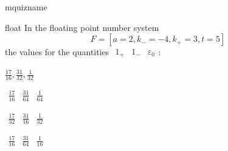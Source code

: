 \documentclass[12pt]{article}
\begin{document}
\begin{quiz}{mquizname}


\begin{multi}{float}
In the floating point number system $$  F=\left[ a=2, k_{-}=-4, k_{+}=3, t=5 \right]  $$ the values for the quantities 
$ {\begin{array}{ccc}1_{+}& 1_{-}& \varepsilon_{0}\end{array}} $:
\item* $ \frac{17}{16}, \frac{31}{32}, \frac{1}{32} $
\item  $ {\begin{array}{ccc}\frac{17}{16}& \frac{31}{64}& \frac{1}{64}\end{array}} $
\item  $ {\begin{array}{ccc}\frac{17}{32}& \frac{31}{16}& \frac{1}{32}\end{array}} $
\item  $ {\begin{array}{ccc}\frac{17}{16}& \frac{31}{64}& \frac{1}{16}\end{array}} $
\end{multi}

\end{quiz}
\end{document}
